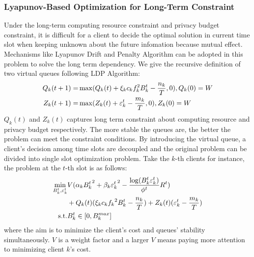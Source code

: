 \documentclass[conference]{IEEEtran}
\begin{document}
\subsubsection{Lyapunov-Based Optimization for Long-Term Constraint}
Under the long-term computing resource constraint and privacy budget constraint, it is difficult for a client to decide the optimal solution in current time slot when keeping unknown about the future infomation because mutual effect.
Mechanisms like Lyapunov Drift and Penalty Algorithm can be adopted in this problem to solve the long term dependency.
We give the recursive definition of two virtual queues following LDP Algorithm:
\begin{alignat}{2}
    Q_k(t + 1) = & \max(Q_k(t) + \xi_kc_kf_k^2B_k^t-{n_k \over T}, 0), Q_k(0) = W \\
    Z_k(t + 1) = & \max(Z_k(t) + \varepsilon_k^t - {m_k \over T}, 0), Z_k(0) = W
\end{alignat}
$Q_k(t)$ and $Z_k(t)$ captures long term constraint about computing resource and privacy budget respectively.
The more stable the queues are, the better the problem can meet the constraint conditions.
By introducing the virtual queue, a client's decision among time slots are decoupled and the original problem can be divided into single slot optimization problem.
Take the $k$-th clients for instance, the problem at the $t$-th slot is as follows:
\begin{alignat}{2}
    \mathop{\min}_{B_k^t, \varepsilon_k^t} & V(\alpha_k{B_k^t}^2 + \beta_k{\varepsilon_k^t}^2 - {\log(B_k^t\varepsilon_k^t) \over \phi^t}R^t) \nonumber\\
                                           & + Q_k(t)(\xi_kc_k{f_k}^2B_k^t - {n_k \over T}) + Z_k(t)(\varepsilon_k^t - {m_k \over T}) \\
    \text{s.t.} & B_k^t \in [0, B_k^{max}]
\end{alignat}
where the aim is to minimize the client's cost and queues' stability simultaneously. $V$ is a weight factor and a larger $V$ means paying more attention to minimizing client $k$'s cost. 
\end{document}
